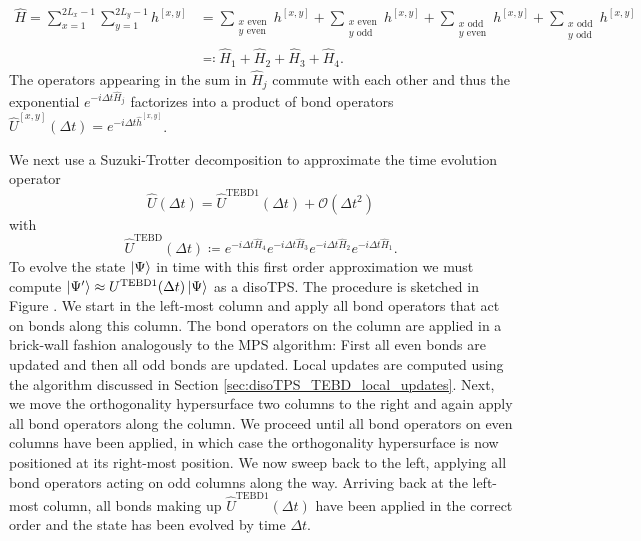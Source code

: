 \begin{equation}
	\label{eq:disoTPS_TEBD_splitting_local_Hamiltonian}
	\begin{split}
		\hat{H} = \sum_{x=1}^{2L_x-1} \sum_{y=1}^{2L_y-1}h^{[x,y]} &= \sum_{\substack{x\text{ even}\\y\text{ even}}} h^{[x, y]} + \sum_{\substack{x\text{ even}\\y\text{ odd}}} h^{[x, y]} + \sum_{\substack{x\text{ odd}\\y\text{ even}}} h^{[x, y]} + \sum_{\substack{x\text{ odd}\\y\text{ odd}}} h^{[x, y]} \\
		&\eqqcolon \hat{H}_1 + \hat{H}_2 + \hat{H}_3 + \hat{H}_4.
	\end{split}
\end{equation}
The operators appearing in the sum in $\hat{H}_j$ commute with each other and thus the exponential $e^{-i\Delta t\hat{H}_j}$ factorizes into a product of bond operators $\hat{U}^{[x, y]}(\Delta t) = e^{-i\Delta t\hat{h}^{[x, y]}}$. \par
We next use a Suzuki-Trotter decomposition to approximate the time evolution operator
\begin{equation}
	\label{eq:disoTPS_TEBD_suzuki_trotter_first_order}
	\hat{U}(\Delta t) = \hat{U}^\text{TEBD1}(\Delta t) + \mathcal{O}(\Delta t^2)
\end{equation}
with
\begin{equation}
	\label{eq:disoTPS_TEBD_first_order_TEBD_operator}
	\hat{U}^\text{TEBD}(\Delta t) \coloneqq e^{-i\Delta t\hat{H}_4} e^{-i\Delta t\hat{H}_3} e^{-i\Delta t\hat{H}_2} e^{-i\Delta t\hat{H}_1}.
\end{equation}
To evolve the state $\ket{\Psi}$ in time with this first order approximation we must compute $\ket{\Psi^\prime} \approx U^\text{TEBD1}(\Delta t)\ket{\Psi}$ as a disoTPS. The procedure is sketched in Figure . We start in the left-most column and apply all bond operators that act on bonds along this column. The bond operators on the column are applied in a brick-wall fashion analogously to the MPS algorithm: First all even bonds are updated and then all odd bonds are updated. Local updates are computed using the algorithm discussed in Section \ref{sec:disoTPS_TEBD_local_updates}. Next, we move the orthogonality hypersurface two columns to the right and again apply all bond operators along the column. We proceed until all bond operators on even columns have been applied, in which case the orthogonality hypersurface is now positioned at its right-most position. We now sweep back to the left, applying all bond operators acting on odd columns along the way. Arriving back at the left-most column, all bonds making up $\hat{U}^\text{TEBD1}(\Delta t)$ have been applied in the correct order and the state has been evolved by time $\Delta t$. \par

